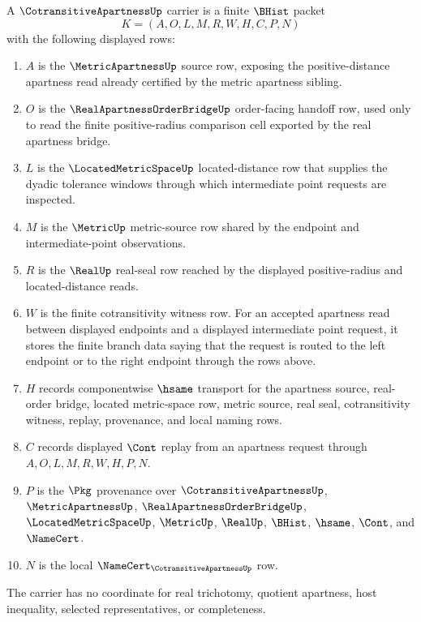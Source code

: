 \begin{definition}
\label{def:cotransitive-apartness-carrier}
A $\CotransitiveApartnessUp$ carrier is a finite $\BHist$ packet
$$
K=(A,O,L,M,R,W,H,C,P,N)
$$
with the following displayed rows:
\begin{enumerate}
\item $A$ is the $\MetricApartnessUp$ source row, exposing the positive-distance apartness read already certified by the metric apartness sibling.
\item $O$ is the $\RealApartnessOrderBridgeUp$ order-facing handoff row, used only to read the finite positive-radius comparison cell exported by the real apartness bridge.
\item $L$ is the $\LocatedMetricSpaceUp$ located-distance row that supplies the dyadic tolerance windows through which intermediate point requests are inspected.
\item $M$ is the $\MetricUp$ metric-source row shared by the endpoint and intermediate-point observations.
\item $R$ is the $\RealUp$ real-seal row reached by the displayed positive-radius and located-distance reads.
\item $W$ is the finite cotransitivity witness row. For an accepted apartness read between displayed endpoints and a displayed intermediate point request, it stores the finite branch data saying that the request is routed to the left endpoint or to the right endpoint through the rows above.
\item $H$ records componentwise $\hsame$ transport for the apartness source, real-order bridge, located metric-space row, metric source, real seal, cotransitivity witness, replay, provenance, and local naming rows.
\item $C$ records displayed $\Cont$ replay from an apartness request through $A,O,L,M,R,W,H,P,N$.
\item $P$ is the $\Pkg$ provenance over $\CotransitiveApartnessUp$, $\MetricApartnessUp$, $\RealApartnessOrderBridgeUp$, $\LocatedMetricSpaceUp$, $\MetricUp$, $\RealUp$, $\BHist$, $\hsame$, $\Cont$, and $\NameCert$.
\item $N$ is the local $\NameCert_{\CotransitiveApartnessUp}$ row.
\end{enumerate}
The carrier has no coordinate for real trichotomy, quotient apartness, host inequality, selected representatives, or completeness.
\end{definition}

